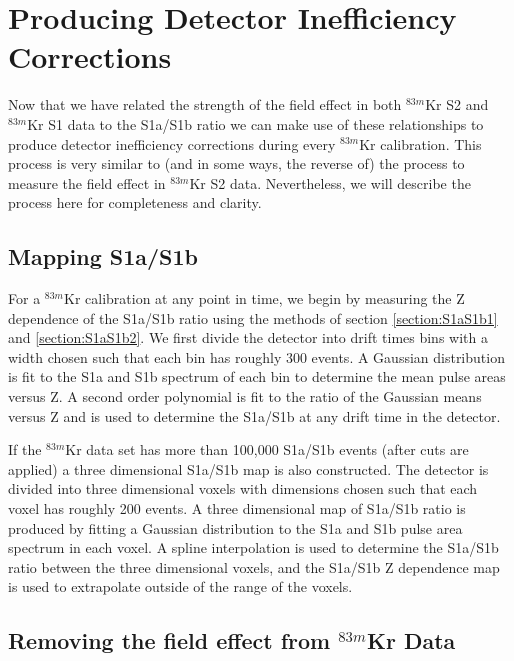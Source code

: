 
\section{Producing Detector Inefficiency Corrections} \label{KrypCalCode}

Now that we have related the strength of the field effect in both $^{83m}$Kr S2 and $^{83m}$Kr S1 data to the S1a/S1b ratio we can make use of these relationships to produce detector inefficiency corrections during every $^{83m}$Kr calibration.  This process is very similar to (and in some ways, the reverse of) the process to measure the field effect in $^{83m}$Kr S2 data. Nevertheless, we will describe the process here for completeness and clarity.

\subsection{Mapping S1a/S1b}

For a $^{83m}$Kr calibration at any point in time, we begin by measuring the Z dependence of the S1a/S1b ratio using the methods of section  \ref{section:S1aS1b1} and  \ref{section:S1aS1b2}.  We first divide the detector into drift times bins with a width chosen such that each bin has roughly 300 events.   A Gaussian distribution is fit to the S1a and S1b spectrum of each bin to determine the mean pulse areas versus Z.  A second order polynomial is fit to the ratio of the Gaussian means versus Z and is used to determine the S1a/S1b at any drift time in the detector.  

If the $^{83m}$Kr data set has more than 100,000 S1a/S1b events (after cuts are applied) a three dimensional S1a/S1b map is also constructed. The detector is divided into three dimensional voxels with dimensions chosen such that each voxel has roughly 200 events.  A three dimensional map of S1a/S1b ratio is produced by fitting a Gaussian distribution to the S1a and S1b pulse area spectrum in each voxel.  A spline interpolation is used to determine the S1a/S1b ratio between the three dimensional voxels, and the S1a/S1b Z dependence map is used to extrapolate outside of the range of the voxels. 

\subsection{Removing the field effect from $^{83m}$Kr Data}

